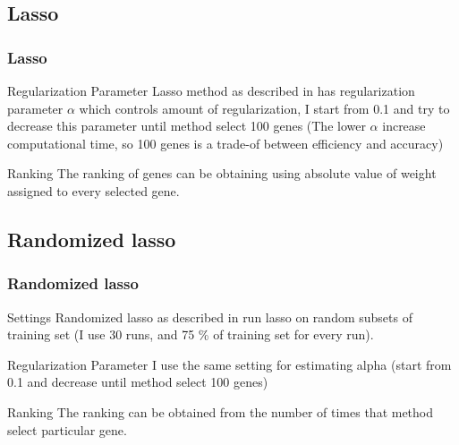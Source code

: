 \documentclass{beamer}
\begin{document}
\subsection{Lasso}
\begin{frame}
\frametitle{Lasso}
\begin{block}{Regularization Parameter}
Lasso method as described in \cite{lasso} has regularization parameter $\alpha$ which controls amount of regularization, I start from 0.1 and try to decrease this parameter until method select 100 genes (The lower $\alpha$ increase computational time, so 100 genes is a trade-of between efficiency and accuracy)
\end{block}
\begin{block}{Ranking}
The ranking of genes can be obtaining using absolute value of weight assigned to every selected gene.
\end{block}
\end{frame}

\subsection{Randomized lasso}
\begin{frame}
\frametitle{Randomized lasso}
\begin{block}{Settings}
Randomized lasso as described in \cite{randomized_lasso} run lasso on random subsets of training set (I use 30 runs, and 75 \% of training set for every run).
\end{block}
\begin{block}{Regularization Parameter}
I use the same setting for estimating alpha (start from 0.1 and decrease until method select 100 genes)
\end{block}
\begin{block}{Ranking}
The ranking can be obtained from the number of times that method select particular gene.
\end{block}
\end{frame}
\end{document}
